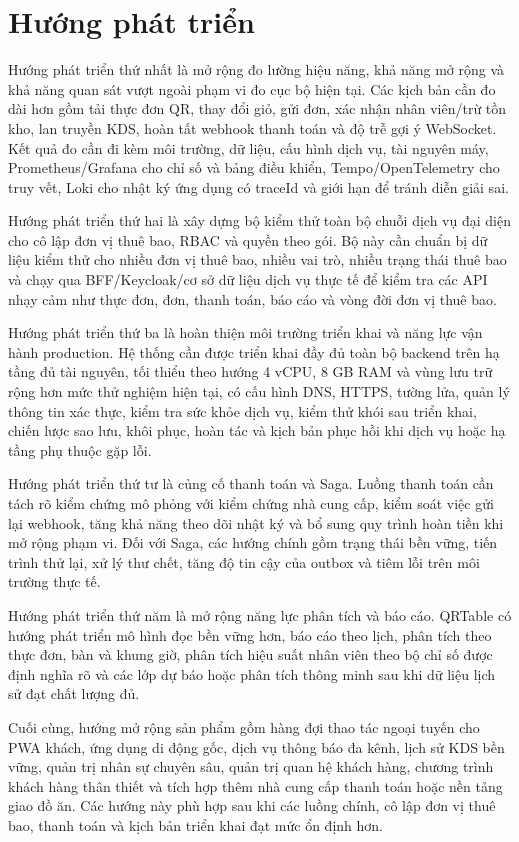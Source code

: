 \section{Hướng phát triển}

Hướng phát triển thứ nhất là mở rộng đo lường hiệu năng, khả năng mở rộng và khả năng quan sát vượt ngoài phạm vi đo cục bộ hiện tại. Các kịch bản cần đo dài hơn gồm tải thực đơn QR, thay đổi giỏ, gửi đơn, xác nhận nhân viên/trừ tồn kho, lan truyền KDS, hoàn tất webhook thanh toán và độ trễ gợi ý WebSocket. Kết quả đo cần đi kèm môi trường, dữ liệu, cấu hình dịch vụ, tài nguyên máy, Prometheus/Grafana cho chỉ số và bảng điều khiển, Tempo/OpenTelemetry cho truy vết, Loki cho nhật ký ứng dụng có traceId và giới hạn để tránh diễn giải sai.

Hướng phát triển thứ hai là xây dựng bộ kiểm thử toàn bộ chuỗi dịch vụ đại diện cho cô lập đơn vị thuê bao, RBAC và quyền theo gói. Bộ này cần chuẩn bị dữ liệu kiểm thử cho nhiều đơn vị thuê bao, nhiều vai trò, nhiều trạng thái thuê bao và chạy qua BFF/Keycloak/cơ sở dữ liệu dịch vụ thực tế để kiểm tra các API nhạy cảm như thực đơn, đơn, thanh toán, báo cáo và vòng đời đơn vị thuê bao.

Hướng phát triển thứ ba là hoàn thiện môi trường triển khai và năng lực vận hành production. Hệ thống cần được triển khai đầy đủ toàn bộ backend trên hạ tầng đủ tài nguyên, tối thiểu theo hướng 4 vCPU, 8 GB RAM và vùng lưu trữ rộng hơn mức thử nghiệm hiện tại, có cấu hình DNS, HTTPS, tường lửa, quản lý thông tin xác thực, kiểm tra sức khỏe dịch vụ, kiểm thử khói sau triển khai, chiến lược sao lưu, khôi phục, hoàn tác và kịch bản phục hồi khi dịch vụ hoặc hạ tầng phụ thuộc gặp lỗi.

Hướng phát triển thứ tư là củng cố thanh toán và Saga. Luồng thanh toán cần tách rõ kiểm chứng mô phỏng với kiểm chứng nhà cung cấp, kiểm soát việc gửi lại webhook, tăng khả năng theo dõi nhật ký và bổ sung quy trình hoàn tiền khi mở rộng phạm vi. Đối với Saga, các hướng chính gồm trạng thái bền vững, tiến trình thử lại, xử lý thư chết, tăng độ tin cậy của outbox và tiêm lỗi trên môi trường thực tế.

Hướng phát triển thứ năm là mở rộng năng lực phân tích và báo cáo. QRTable có hướng phát triển mô hình đọc bền vững hơn, báo cáo theo lịch, phân tích theo thực đơn, bàn và khung giờ, phân tích hiệu suất nhân viên theo bộ chỉ số được định nghĩa rõ và các lớp dự báo hoặc phân tích thông minh sau khi dữ liệu lịch sử đạt chất lượng đủ.

Cuối cùng, hướng mở rộng sản phẩm gồm hàng đợi thao tác ngoại tuyến cho PWA khách, ứng dụng di động gốc, dịch vụ thông báo đa kênh, lịch sử KDS bền vững, quản trị nhân sự chuyên sâu, quản trị quan hệ khách hàng, chương trình khách hàng thân thiết và tích hợp thêm nhà cung cấp thanh toán hoặc nền tảng giao đồ ăn. Các hướng này phù hợp sau khi các luồng chính, cô lập đơn vị thuê bao, thanh toán và kịch bản triển khai đạt mức ổn định hơn.
